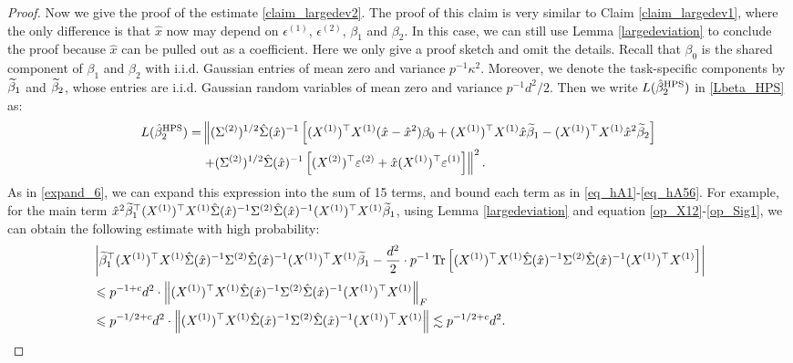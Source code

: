 \begin{proof}
Now we give the proof of the estimate \eqref{claim_largedev2}.
The proof of this claim is very similar to Claim \ref{claim_largedev1}, where the only difference is that $\hat x$ now may depend on $\epsilon^{(1)}$, $\epsilon^{(2)}$, $\beta_1$ and $\beta_2$.
In this case, we can still use  Lemma \ref{largedeviation} to conclude the proof because $\hat x$ can be pulled out as a coefficient.
Here we only give a proof sketch and omit the details.
Recall that $\beta_0$ is the shared component of $\beta_1$ and $\beta_2$ with i.i.d. Gaussian entries of mean zero and variance $p^{-1}\kappa^2$. Moreover, we denote the task-specific components by $\widetilde\beta_1$ and $\widetilde\beta_2$, whose entries are i.i.d. Gaussian random variables of mean zero and variance $p^{-1} d^2 / 2$. Then we write $L(\hat{\beta}_2^{\textup{HPS}}) $ in \eqref{Lbeta_HPS} as:
\begin{align}
L(\hat{\beta}_2^{\textup{HPS}})  =&  \left\| (\Sigma^{(2)})^{1/2}\hat \Sigma(\hat x)^{-1} \left[(X^{(1)})^\top X^{(1)} (\hat x -\hat x^2)\beta_0+(X^{(1)})^\top X^{(1)} \hat x\widetilde \beta_1 - (X^{(1)})^\top X^{(1)}  \hat x^2\widetilde \beta_2 \right] \right. \nonumber\\
&\left. + (\Sigma^{(2)})^{1/2}\hat \Sigma(\hat x)^{-1}\left[ (X^{(2)})^\top \varepsilon^{(2)} + \hat x   (X^{(1)})^\top \varepsilon^{(1)} \right]\right\|^2. \label{expand_15}
\end{align}
As in \eqref{expand_6}, we can expand this expression into the sum of 15 terms, and bound each term as in \eqref{eq_hA1}-\eqref{eq_hA56}. For example, for the main term $\hat x^2 \widetilde \beta_1^\top (X^{(1)})^\top X^{(1)} \hat \Sigma(\hat x)^{-1}  \Sigma^{(2)} \hat \Sigma(\hat x)^{-1}  (X^{(1)})^\top X^{(1)}\widetilde\beta_1$, using 
Lemma \ref{largedeviation} and equation \eqref{op_X12}-\eqref{op_Sig1}, we can obtain the following estimate with high probability:
\begin{align*}
&  \left|\wt \beta_1^\top (X^{(1)})^\top X^{(1)} \hat \Sigma(\hat x)^{-1}  \Sigma^{(2)} \hat \Sigma(\hat x)^{-1}  (X^{(1)})^\top X^{(1)}\wt\beta_1 - \frac{d^2}{2} \cdot p^{-1}\bigtr{(X^{(1)})^\top X^{(1)} \hat \Sigma(\hat x)^{-1}  \Sigma^{(2)} \hat \Sigma(\hat x)^{-1}  (X^{(1)})^\top X^{(1)}}\right| \\
&\le p^{-1+c}d^2 \cdot \left\| (X^{(1)})^\top X^{(1)} \hat \Sigma(\hat x)^{-1}  \Sigma^{(2)} \hat \Sigma(\hat x)^{-1}  (X^{(1)})^\top X^{(1)} \right\|_F \\
&\le p^{-1/2+c}d^2 \cdot  \left\| (X^{(1)})^\top X^{(1)} \hat \Sigma(\hat x)^{-1}  \Sigma^{(2)} \hat \Sigma(\hat x)^{-1}  (X^{(1)})^\top X^{(1)} \right\|  \lesssim p^{-1/2+c}d^2.

\end{align*}
\end{proof}
